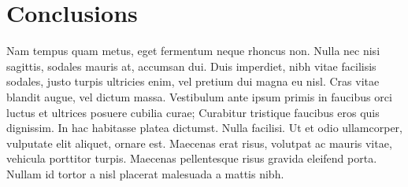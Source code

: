 \section{Conclusions}


Nam tempus quam metus, eget fermentum neque rhoncus non. Nulla nec nisi sagittis, sodales mauris at, accumsan dui. Duis imperdiet, nibh vitae facilisis sodales, justo turpis ultricies enim, vel pretium dui magna eu nisl. Cras vitae blandit augue, vel dictum massa. Vestibulum ante ipsum primis in faucibus orci luctus et ultrices posuere cubilia curae; Curabitur tristique faucibus eros quis dignissim. In hac habitasse platea dictumst. Nulla facilisi. Ut et odio ullamcorper, vulputate elit aliquet, ornare est. Maecenas erat risus, volutpat ac mauris vitae, vehicula porttitor turpis. Maecenas pellentesque risus gravida eleifend porta. Nullam id tortor a nisl placerat malesuada a mattis nibh.
